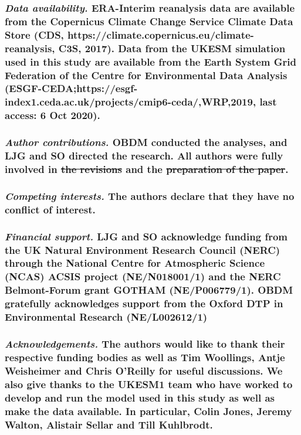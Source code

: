 \documentclass[wcd, manuscript]{copernicus}
\providecommand{\DIFadd}[1]{{\protect\color{blue}\uwave{#1}}} %
\providecommand{\DIFdel}[1]{{\protect\color{red}\sout{#1}}}                      %
\providecommand{\DIFaddbegin}{} %
\providecommand{\DIFaddend}{} %
\providecommand{\DIFdelbegin}{} %
\providecommand{\DIFdelend}{} %
\begin{document}

\subsubsection*{\normalsize\normalfont\textit{Data availability. }ERA-Interim reanalysis data are available from the Copernicus Climate Change Service Climate Data Store \newline(CDS, https://climate.copernicus.eu/climate-reanalysis,
C3S, 2017). Data from the UKESM simulation used in this study are available from the Earth System Grid Federation of the Centre for Environmental Data Analysis (ESGF-CEDA;https://esgf-index1.ceda.ac.uk/projects/cmip6-ceda/,WRP,2019, last access: 6 Oct 2020).}

\subsubsection*{\normalsize\normalfont\textit{Author contributions. } OBDM conducted the analyses, and LJG and SO directed the research. All authors were fully involved in \DIFdelbegin \DIFdel{the revisions }\DIFdelend \DIFaddbegin \DIFadd{preparing }\DIFaddend and \DIFaddbegin \DIFadd{revising }\DIFaddend the \DIFdelbegin \DIFdel{preparation of the paper}\DIFdelend \DIFaddbegin \DIFadd{text}\DIFaddend .}

\subsubsection*{\normalsize\normalfont\textit{Competing interests. }The authors declare that they have no conflict of interest.}

\subsubsection*{\normalsize\normalfont\textit{Financial support. }LJG and SO acknowledge funding from the UK Natural Environment Research Council (NERC) through the National Centre for Atmospheric Science (NCAS) ACSIS project (NE/N018001/1) and the NERC Belmont-Forum grant GOTHAM (NE/P006779/1). OBDM gratefully acknowledges support from the Oxford DTP in Environmental Research (NE/L002612/1)}

\subsubsection*{\normalsize\normalfont\textit{Acknowledgements. }The authors would like to thank their respective funding bodies as well as Tim Woollings, Antje Weisheimer and Chris O'Reilly for useful discussions. We also give thanks to the UKESM1 team who have worked to develop and run the model used in this study as well as make the data available. In particular, Colin Jones, Jeremy Walton, Alistair Sellar and Till Kuhlbrodt.}
\end{document}
